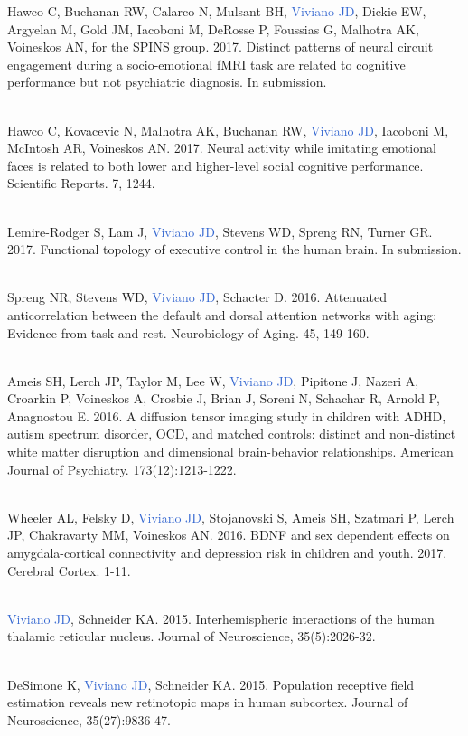 \documentclass[a4paper,11pt,oneside]{book}
\begin{document}
\begin{flushleft}
Hawco C, Buchanan RW, Calarco N, Mulsant BH, \textcolor{highlight}{Viviano JD}, Dickie EW, Argyelan M, Gold JM, Iacoboni M, DeRosse P, Foussias G, Malhotra AK, Voineskos AN, for the SPINS group. 2017. Distinct patterns of neural circuit engagement during a socio-emotional fMRI task are related to cognitive performance but not psychiatric diagnosis. In submission. \\\

Hawco C, Kovacevic N, Malhotra AK, Buchanan RW, \textcolor{highlight}{Viviano JD}, Iacoboni M, McIntosh AR, Voineskos AN. 2017. Neural activity while imitating emotional faces is related to both lower and higher-level social cognitive performance. Scientific Reports. 7, 1244. \\\

Lemire-Rodger S, Lam J, \textcolor{highlight}{Viviano JD}, Stevens WD, Spreng RN, Turner GR. 2017. Functional topology of executive control in the human brain. In submission. \\\

Spreng NR, Stevens WD, \textcolor{highlight}{Viviano JD}, Schacter D. 2016. Attenuated anticorrelation between the default and dorsal attention networks with aging: Evidence from task and rest. Neurobiology of Aging. 45, 149-160. \\\

Ameis SH, Lerch JP, Taylor M, Lee W, \textcolor{highlight}{Viviano JD}, Pipitone J, Nazeri A, Croarkin P, Voineskos A, Crosbie J, Brian J, Soreni N, Schachar R, Arnold P, Anagnostou E. 2016. A diffusion tensor imaging study in children with ADHD, autism spectrum disorder, OCD, and matched controls: distinct and non-distinct white matter disruption and dimensional brain-behavior relationships. American Journal of Psychiatry. 173(12):1213-1222. \\\

Wheeler AL, Felsky D, \textcolor{highlight}{Viviano JD}, Stojanovski S, Ameis SH, Szatmari P, Lerch JP, Chakravarty MM, Voineskos AN. 2016. BDNF and sex dependent effects on amygdala-cortical connectivity and depression risk in children and youth. 2017. Cerebral Cortex. 1-11. \\\

\textcolor{highlight}{Viviano JD}, Schneider KA. 2015. Interhemispheric interactions of the human thalamic reticular nucleus. Journal of Neuroscience, 35(5):2026-32. \\\

DeSimone K, \textcolor{highlight}{Viviano JD}, Schneider KA. 2015. Population receptive field estimation reveals new retinotopic maps in human subcortex. Journal of Neuroscience, 35(27):9836-47. \\\


\end{flushleft}
\end{document}
